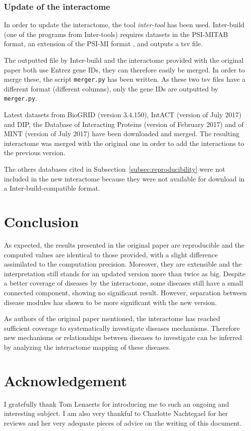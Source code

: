 \documentclass[letterpaper]{article}
\begin{document}
		\subsubsection{Update of the interactome}
		In order to update the interactome, the tool \textit{inter-tool} \citep{inter-tools} has been used.
		Inter-build (one of the programs from Inter-tools) requires datasets in the PSI-MITAB format, an extension of the
		PSI-MI format \citep{MITABFormat}, and outputs a tsv file.

		The outputted file by Inter-build and the interactome provided with the original paper both use Entrez
		gene IDs, they can therefore easily be merged. In order to merge these, the script \texttt{merger.py}
		has been written. As these two tsv files have a different format (different columns), only the gene IDs
		are outputted by \texttt{merger.py}.

		Latest datasets from BioGRID (version 3.4.150), IntACT (version of July 2017) and DIP, the Database of
		Interacting Proteins (version of February 2017) \citep{salwinski2004DIP} and of MINT (version of July
		2017) have been downloaded and merged. The resulting interactome was merged with the original one in
		order to add the interactions to the previous version.

		The others databases cited in Subsection~\ref{subsec:reproducibility} were not included in the new
		interactome because they were not available for download in a Inter-build-compatible format.

\section{Conclusion}
As expected, the results presented in the original paper are reproducible and the computed values are
identical to those provided, with a slight difference assimilated to the computation precision.
Moreover, they are extensible and the interpretation still stands for an updated version more than
twice as big. Despite a better coverage of diseases by the interactome, some diseases still have a
small connected component, showing no significant result. However, separation between disease modules has
shown to be more significant with the new version.

As authors of the original paper mentioned, the interactome has reached sufficient coverage to
systematically investigate diseases mechanisms. Therefore new mechanisms or relationships between
diseases to investigate can be inferred by analyzing the interactome mapping of these diseases.

\section*{Acknowledgement}
I gratefully thank Tom Lenaerts for introducing me to such an ongoing and interesting subject.
I am also very thankful to Charlotte Nachtegael for her reviews and her very adequate pieces
of advice on the writing of this document.

\pagebreak

\footnotesize

{}
\end{document}
